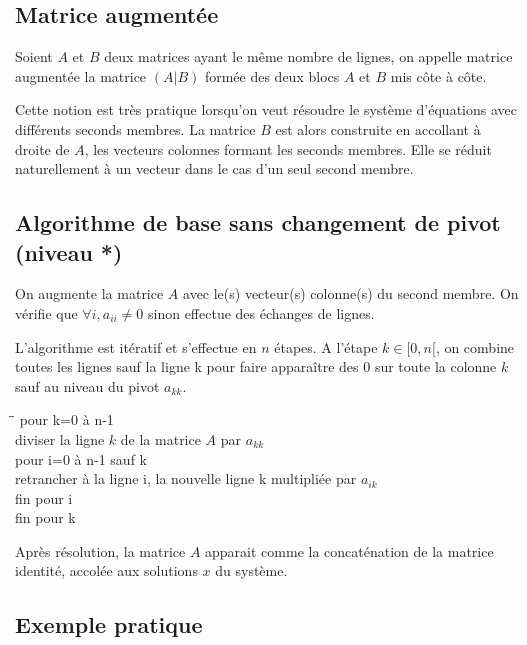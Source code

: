\documentclass[a4paper, 10pt]{article}
\begin{document}
\subsection{Matrice augmentée}

Soient $A$ et $B$ deux matrices  ayant le même nombre de lignes, on appelle matrice augmentée la matrice $(A | B)$ formée des deux blocs $A$ et $B$ mis côte à côte.

Cette notion est très pratique lorsqu'on veut résoudre le système d'équations avec différents seconds
membres. La matrice $B$ est alors construite en accollant à droite de $A$, les vecteurs colonnes formant les seconds membres.
Elle se réduit naturellement à un vecteur dans le cas d'un seul second membre.

\subsection{Algorithme de base sans changement de pivot (niveau *)}

On augmente la matrice $A$ avec le(s) vecteur(s) colonne(s) du second membre.
On vérifie que $\forall i,  a_{ii} \neq 0$ sinon effectue des échanges de lignes. 

L'algorithme est itératif et s'effectue en $n$ étapes. A l'étape $k \in [0, n[$, on
combine toutes les lignes sauf la ligne k pour faire apparaître des $0$ sur toute
la colonne $k$ sauf au niveau du pivot $a_{kk}$.

\begin{tabbing}
\hspace{1cm}\= \hspace{1cm}\= \kill
pour k=0 à n-1 \\
\> diviser la ligne $k$ de la matrice $A$ par $a_{kk}$ \\
\> pour i=0 à n-1 sauf k \\
\> \> retrancher à la ligne i, la nouvelle ligne k multipliée par $a_{ik}$ \\
\> fin pour i \\
fin pour k \\
\end{tabbing}

Après résolution, la matrice $A$ apparait comme la concaténation de la matrice
identité, accolée aux solutions $x$ du système.

\subsection{Exemple pratique}
\end{document}
